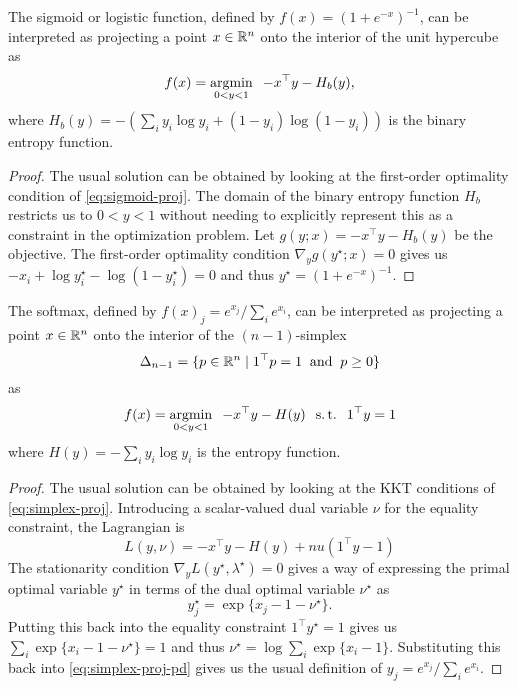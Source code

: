 \newpage
\begin{theorem}
  The sigmoid or logistic function, defined by $f(x) = (1+e^{-x})^{-1}$,
  can be interpreted as projecting a point $x\in\mathbb{R}^n$ onto
  the interior of the unit hypercube as
  \begin{equation}
    f(x) = \operatorname*{argmin}_{0<y<1} \;\; -x^\top y -H_b(y),
    \label{eq:sigmoid-proj}
  \end{equation}
  where $H_b(y) = - \left(\sum_i y_i\log y_i + (1-y_i)\log (1-y_i)\right)$ is the
  binary entropy function.
\end{theorem}

\begin{proof}
  The usual solution can be obtained by looking at
  the first-order optimality condition of
  \cref{eq:sigmoid-proj}.
  The domain of the binary entropy function $H_b$ restricts
  us to $0<y<1$ without needing to explicitly represent this
  as a constraint in the optimization problem.
  Let $g(y; x) = -x^\top y -H_b(y)$ be the objective.
  The first-order optimality condition $\nabla_y g(y^\star; x) = 0$
  gives us $-x_i + \log y_i^\star - \log (1-y_i^\star) = 0$
  and thus $y^\star = (1+e^{-x})^{-1}$.
\end{proof}

\begin{theorem}
  The softmax, defined by $f(x)_j = e^{x_j} / \sum_i e^{x_i}$,
  can be interpreted as projecting a point $x\in\mathbb{R}^n$ onto
  the interior of the $(n-1)$-simplex
  $$\Delta_{n-1}=\{p\in\mathbb{R}^n\; \vert\; 1^\top p = 1 \; \; {\rm and} \;\; p \geq 0 \}$$
  as
  \begin{equation}
    f(x) = \operatorname*{argmin}_{0<y<1} \;\; -x^\top y - H(y) \;\; \operatorname*{s.t.}\;\; 1^\top y = 1
    \label{eq:simplex-proj}
  \end{equation}
  where $H(y) = -\sum_i y_i \log y_i$ is the entropy function.
\end{theorem}

\begin{proof}
  The usual solution can be obtained by looking at
  the KKT conditions of \cref{eq:simplex-proj}.
  Introducing a scalar-valued dual variable $\nu$ for the
  equality constraint, the Lagrangian is
  \begin{equation}
    L(y, \nu) = -x^\top y - H(y) + nu(1^\top y - 1)
  \end{equation}
  The stationarity condition
  $\nabla_y L(y^\star, \lambda^\star) = 0$
  gives a way of expressing the primal optimal
  variable $y^\star$ in terms of the dual optimal
  variable $\nu^\star$ as
  \begin{equation}
    \label{eq:simplex-proj-pd}
    y^\star_j=\exp\{x_j-1-\nu^\star\}.
  \end{equation}
  Putting this back into the equality constraint
  $1^\top y^\star = 1$ gives us
  $\sum_i \exp\{x_i-1-\nu^\star\} = 1$ and thus
  $\nu^\star = \log\sum_i\exp\{x_i-1\}$.
  Substituting this back into \cref{eq:simplex-proj-pd}
  gives us the usual definition of
  $y_j = e^{x_j} / \sum_i e^{x_i}$.
\end{proof}

